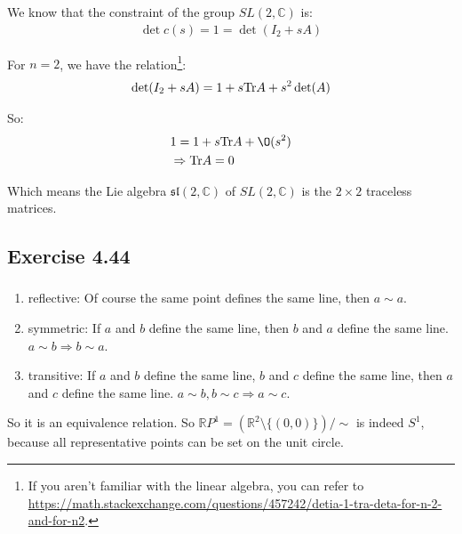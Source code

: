 \documentclass[]{ctexart}
\newcommand{\tr}{{\rm Tr}}
\begin{document}
		We know that the constraint of the group $SL(2,\mathbb{C})$ is:
			\begin{equation*}
			\begin{aligned}
				\det c(s)=1=\det (I_2+sA)
			\end{aligned}
			\end{equation*}
		
		For $n=2$, we have the relation\footnote{If you aren't familiar with the linear algebra, you can refer to \url{https://math.stackexchange.com/questions/457242/detia-1-tra-deta-for-n-2-and-for-n2}.}:
			\begin{equation*}
			\begin{aligned}
				\det(I_2+sA)=1+s\tr A+s^2\det(A)
			\end{aligned}
			\end{equation*}
			
		So:
			\begin{equation*}
			\begin{aligned}
				&1=1+s\tr A+\O(s^2)\\
				&\Rightarrow \tr A=0
			\end{aligned}
			\end{equation*}
		
		Which means the Lie algebra $\mathfrak{sl}(2,\mathbb{C})$ of $SL(2,\mathbb{C})$ is the $2\times 2$ traceless matrices. 
	
	\subsection{Exercise 4.44}
		\subsubsection{}
			\begin{enumerate}
				\item reflective: Of course the same point defines the same line, then $a\sim a$.
				\item symmetric: If $a$ and $b$ define the same line, then $b$ and $a$ define the same line. $a\sim b\Rightarrow b\sim a$. 
				\item transitive: If $a$ and  $b$ define the same line, $b$ and $c$ define the same line, then $a$ and $c$ define the same line. $a\sim b,b\sim c\Rightarrow a\sim c$. 
			\end{enumerate}
		
		So it is an equivalence relation. So $\mathbb{R}P^1=(\mathbb{R}^2\setminus \{(0,0)\})/\sim$ is indeed $S^1$, because all representative points can be set on the unit circle. 
		
\end{document}
